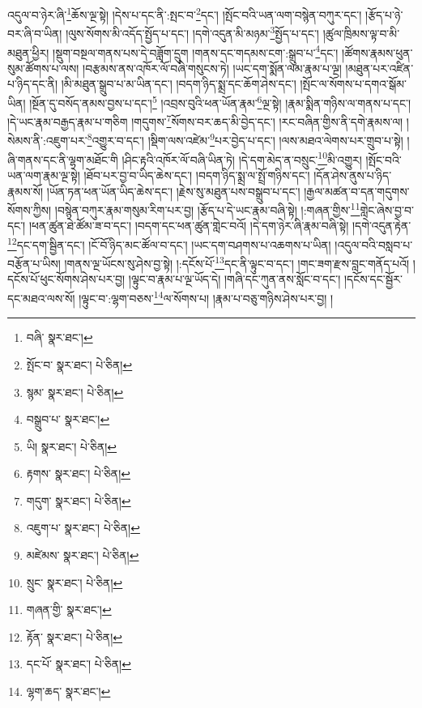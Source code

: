 འདུལ་བ་ཉེར་ཞི་\footnote{བཞི་  སྣར་ཐང་། }ཆོས་ལྔ་སྟེ། །དེས་པ་དང་ནི་:སྤང་བ་\footnote{སྤོང་བ་  སྣར་ཐང་།  པེ་ཅིན། }དང་། །སྤོང་བའི་ཡན་ལག་བསྙེན་བཀུར་དང་། །རྩོད་པ་ཉེ་བར་ཞི་བ་ཡིན། །ལུས་སོགས་མི་འདོད་སྤྱོད་པ་དང་། །དགེ་འདུན་མི་མཉམ་\footnote{སྙམ་  སྣར་ཐང་།  པེ་ཅིན། }སྤྱོད་པ་དང་། །ཚུལ་ཁྲིམས་ལྟ་བ་མི་མཐུན་ཕྱིར། །སྡུག་བསྔལ་གནས་པས་དེ་བཟློག་དྲུག །གནས་དང་གདམས་ངག་:སྒྲུབ་པ་\footnote{བསྒྲུབ་པ་  སྣར་ཐང་། }དང་། །ཚོགས་རྣམས་ཕུན་སུམ་ཚོགས་པ་ལས། །བརྩམས་ནས་འཁོར་ལོ་བཞི་གསུངས་ཏེ། །ཡང་དག་སྨོན་ལམ་རྣམ་པ་ལྔ། །མཐུན་པར་འཛིན་པ་ཉིད་དང་ནི། །མི་མཐུན་སྒྲུབ་པ་མ་ཡིན་དང་། །བདག་ཉིད་སྨྲ་དང་ཆོག་ཤེས་དང་། །སྤོང་ལ་སོགས་པ་དགའ་སྒོམ་ཡིན། །སྔོན་དུ་བསོད་ནམས་བྱས་པ་དང་།\footnote{ཡི།  སྣར་ཐང་།  པེ་ཅིན། } །འབྲས་བུའི་ཕན་ཡོན་རྣམ་\footnote{རྟགས་  སྣར་ཐང་།  པེ་ཅིན། }ལྔ་སྟེ། །རྣམ་སྨིན་གཉིས་ལ་གནས་པ་དང་། །དེ་ཡང་རྣམ་བརྒྱད་རྣམ་པ་གཅིག །གདུགས་\footnote{གདུག་  སྣར་ཐང་།  པེ་ཅིན། }སོགས་བར་ཆད་མི་བྱེད་དང་། །རང་བཞིན་གྱིས་ནི་དགེ་རྣམས་ལ། །སེམས་ནི་:འཇུག་པར་\footnote{འཇུག་པ་  སྣར་ཐང་།  པེ་ཅིན། }འགྱུར་བ་དང་། །སྡིག་ལས་འཛེམ་\footnote{མཛེམས་  སྣར་ཐང་།  པེ་ཅིན། }པར་བྱེད་པ་དང་། །ལས་མཐའ་ལེགས་པར་གྲུབ་པ་སྟེ། །ཞི་གནས་དང་ནི་ལྷག་མཐོང་གི །ཤིང་རྟའི་འཁོར་ལོ་བཞི་ཡིན་ཏེ། །དེ་དག་མེད་ན་བསྲུང་\footnote{སྲུང་  སྣར་ཐང་།  པེ་ཅིན། }མི་འགྱུར། །སྤོང་བའི་ཡན་ལག་རྣམ་ལྔ་སྟེ། །ཐོབ་པར་བྱ་བ་ཡིད་ཆེས་དང་། །བདག་ཉིད་སྨྲ་ལ་སྤྲོ་གཉིས་དང་། །དོན་ཤེས་ནུས་པ་ཉིད་རྣམས་སོ། །ཡོན་ཏན་ཕན་ཡོན་ཡིད་ཆེས་དང་། །རྗེས་སུ་མཐུན་པས་བསྒྲུབ་པ་དང་། །རྒྱལ་མཚན་བ་དན་གདུགས་སོགས་ཀྱིས། །བསྙེན་བཀུར་རྣམ་གསུམ་རིག་པར་བྱ། །རྩོད་པ་དེ་ཡང་རྣམ་བཞི་སྟེ། །:གཞན་གྱིས་\footnote{གཞན་གྱི་  སྣར་ཐང་། }གླེང་ཞེས་བྱ་བ་དང་། །ཕན་ཚུན་ཐེ་ཚོམ་ཟ་བ་དང་། །བདག་དང་ཕན་ཚུན་གླེང་བའོ། །དེ་དག་ཉེར་ཞི་རྣམ་བཞི་སྟེ། །དགེ་འདུན་རྟེན་\footnote{རྟོན་  སྣར་ཐང་།  པེ་ཅིན། }དང་དག་སྦྱིན་དང་། །ངོ་བོ་ཉིད་མང་ཚོལ་བ་དང་། །ཡང་དག་བཤགས་པ་འཆགས་པ་ཡིན། །འདུལ་བའི་བསླབ་པ་བརྩོན་པ་ཡིས། །གནས་ལྔ་ཡོངས་སུ་ཤེས་བྱ་སྟེ། །:དངོས་པོ་\footnote{དང་པོ་  སྣར་ཐང་།  པེ་ཅིན། }དང་ནི་ལྟུང་བ་དང་། །གང་ཟག་རྫས་བླང་གནོད་པའོ། །དངོས་པོ་ཕུང་སོགས་ཤེས་པར་བྱ། །ལྟུང་བ་རྣམ་པ་ལྔ་ཡོད་དེ། །གཞི་དང་ཀུན་ནས་སློང་བ་དང་། །དངོས་དང་སྦྱོར་དང་མཐའ་ལས་སོ། །ལྟུང་བ་:ལྷག་བཅས་\footnote{ལྷག་ཆད་  སྣར་ཐང་། }ལ་སོགས་པ། །རྣམ་པ་བཅུ་གཉིས་ཤེས་པར་བྱ། །
